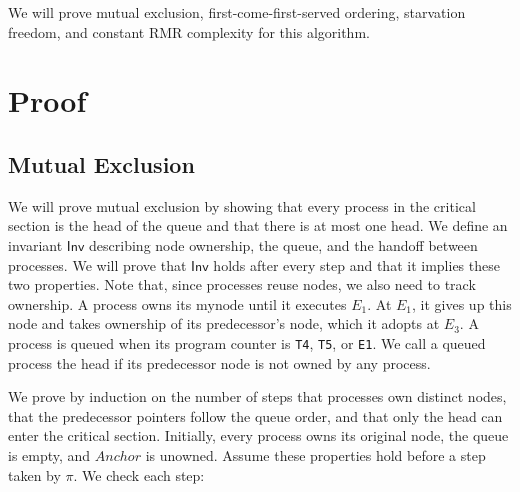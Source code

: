 \documentclass[12pt]{amsproc}
\begin{document}
We will prove mutual exclusion, first-come-first-served ordering, starvation freedom, and constant RMR complexity for this algorithm. 

\newpage 

\section{Proof}


\subsection{Mutual Exclusion}

\bbni 

We will prove mutual exclusion by showing that every process in the critical section is the head of the queue and that there is at most one head. We define an invariant $\mathsf{Inv}$ describing node ownership, the queue, and the handoff between processes. We will prove that $\mathsf{Inv}$ holds after every step and that it implies these two properties. Note that, since processes reuse nodes, we also need to track ownership. A process owns its $\mathrm{mynode}$ until it executes $E_1$. At $E_1$, it gives up this node and takes ownership of its predecessor's node, which it adopts at $E_3$. A process is queued when its program counter is \texttt{T4}, \texttt{T5}, or \texttt{E1}. We call a queued process the head if its predecessor node is not owned by any process.

We prove by induction on the number of steps that processes own distinct nodes, that the predecessor pointers follow the queue order, and that only the head can enter the critical section. Initially, every process owns its original node, the queue is empty, and $\mathit{Anchor}$ is unowned. Assume these properties hold before a step taken by $\pi$. We check each step:
\end{document}
